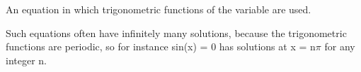 An equation in which trigonometric functions of the variable are used.
\par
Such equations often have infinitely many solutions, because the trigonometric
functions are periodic, so for instance sin(x) = 0 has solutions at x = 
$ \mathrm{n} \pi $ for
any integer n.